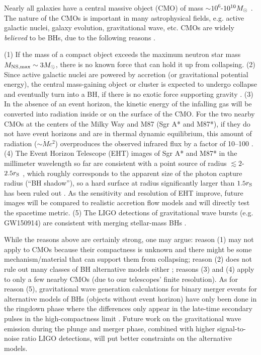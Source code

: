 \documentclass[useAMS,usenatbib]{mn2e}
\begin{document}
Nearly all galaxies have a central massive object (CMO) of
mass $\sim10^6$-$10^{10}M_{\rm \odot}$
\citep[e.g.][]{2013ARA&A..51..511K}. The nature of the CMOs is
important in many 
astrophysical fields, e.g. active galactic nuclei, galaxy evolution,
gravitational wave, etc. CMOs are widely {\it believed} to be BHs, due to the
following reasons \citep[many of which have been discussed by][]{
2008NewAR..51..733N}.

(1) If the mass of a compact object exceeds the maximum neutron star
mass $M_{\rm NS,max}\sim3M_{\odot}$, there is no known force that can hold
it up from collapsing.
(2) Since active galactic nuclei are powered by
accretion (or gravitational potential energy), the central
mass-gaining object or cluster is expected to undergo collapse
and eventually turn into a BH, if there is no exotic force supporting
gravity \citep[e.g.][]{1984ARA&A..22..471R}. 
(3) In the absence of an event horizon, the kinetic energy of the
infalling gas will be converted into radiation
inside or on the surface of the CMO. For the two
nearby CMOs at the centers of the Milky Way and M87 (Sgr A* and 
M87*), if they do
not have event horizons and are in thermal dynamic equilibrium, this
amount of radiation ($\sim\dot{M}c^2$) overproduces the observed 
infrared flux by a factor of 10--100 \citep{2009ApJ...701.1357B,
  2015ApJ...805..179B}. (4) The Event Horizon Telescope (EHT) images
of Sgr A* and M87* in the millimeter wavelength so far are consistent
with a point source of radius $\lesssim2$-$2.5r_{\rm S}$
\citep{2008Natur.455...78D, 2012Sci...338..355D}, which roughly
corresponds to the apparent size of the photon capture radius
(``BH shadow''), so a hard surface at radius
significantly larger than $1.5r_{\rm S}$ has been ruled out
\citep{2006ApJ...638L..21B}. As the sensitivity  
and resolution of EHT improve, future images will be compared to
realistic accretion flow models and will directly test the spacetime
metric. (5) The LIGO detections of gravitational wave bursts
(e.g. GW150914) are consistent with merging stellar-mass BHs
\citep{2016PhRvL.116v1101A}.

While the reasons above are certainly strong, one may argue: reason (1)
may not apply to CMOs because their compactness is unknown and there
might be some mechanism/material that can support them from
collapsing; reason (2) does not rule out many classes of BH
alternative models either \citep[e.g. boson stars and gravastars,
][]{2003CQGra..20R.301S, 2004PNAS..101.9545M}; reasons (3) and (4)
apply to only a few nearby CMOs (due to our telescopes' finite resolution).
As for reason (5), gravitational wave generation calculations for
binary merger events for alternative models of BHs (objects without
event horizon) have only been done in the ringdown phase where the
differences only appear in the late-time secondary pulses in the
high-compactness limit \citep[e.g.][]{2016PhRvD..94h4002Y}. Future
work on the gravitational wave emission
during the plunge and merger phase, combined with higher
signal-to-noise ratio LIGO detections, will put better constraints on
the alternative models. 
\end{document}
